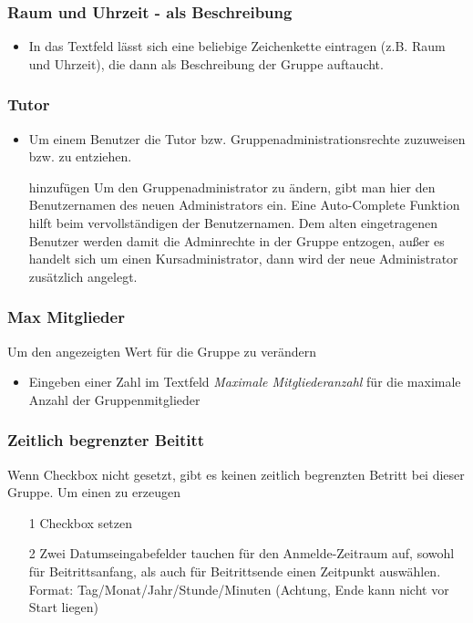 \subsubsection{Raum und Uhrzeit - als Beschreibung}
\begin{itemize}
	\item In das Textfeld lässt sich eine beliebige Zeichenkette eintragen (z.B. Raum und Uhrzeit), die dann als Beschreibung der Gruppe auftaucht. 
\end{itemize}

\subsubsection{Tutor}
\begin{itemize}
	\item Um einem Benutzer die Tutor bzw. Gruppenadministrationsrechte zuzuweisen bzw. zu entziehen. 
	\item[hinzufügen] Um den Gruppenadministrator zu ändern, gibt man hier den Benutzernamen des neuen Administrators ein. Eine Auto-Complete Funktion hilft beim vervollständigen der Benutzernamen. Dem alten eingetragenen Benutzer werden damit die Adminrechte in der Gruppe entzogen, außer es handelt sich um einen Kursadministrator, dann wird der neue Administrator zusätzlich angelegt.
\end{itemize}

\subsubsection{Max Mitglieder}
Um den angezeigten Wert für die Gruppe zu verändern
\begin{itemize}
	\item Eingeben einer Zahl im Textfeld \textit{Maximale Mitgliederanzahl} für die maximale Anzahl der Gruppenmitglieder 
\end{itemize}


\subsubsection{Zeitlich begrenzter Beititt}
Wenn Checkbox nicht gesetzt, gibt es keinen zeitlich begrenzten Betritt bei dieser Gruppe. Um einen zu erzeugen
\begin{itemize}
\item[1] Checkbox setzen 
\item[2] Zwei Datumseingabefelder tauchen für den Anmelde-Zeitraum auf, sowohl für Beitrittsanfang, als auch für Beitrittsende einen Zeitpunkt auswählen. Format: Tag/Monat/Jahr/Stunde/Minuten 
(Achtung, Ende kann nicht vor Start liegen)
\end{itemize}

